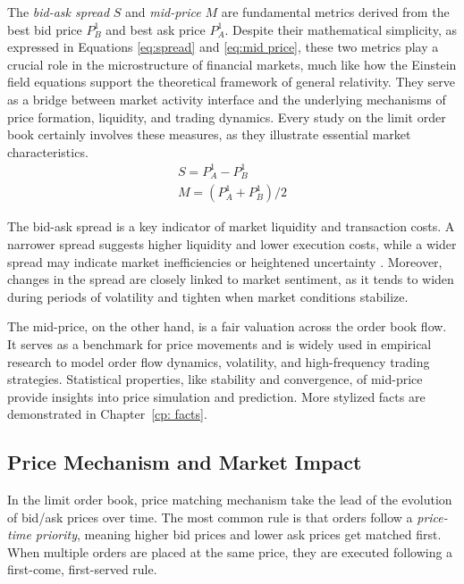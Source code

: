 The \textit{bid-ask spread} $S$ and \textit{mid-price} $M$ are fundamental metrics derived from the best bid price $P_B ^ {1}$ and best ask price $P_A ^ {1}$. Despite their mathematical simplicity, as expressed in Equations \ref{eq:spread} and \ref{eq:mid price}, these two metrics play a crucial role in the \gls{microstructure of financial markets}, much like how the Einstein field equations support the theoretical framework of general relativity. They serve as a bridge between market activity interface and the underlying mechanisms of price formation, liquidity, and trading dynamics. Every study on the limit order book certainly involves these measures, as they illustrate essential market characteristics.
\begin{align}
    S = P_A ^ {1} - P_B ^ {1}  \label{eq:spread}\\
    M = (P_A ^ {1} + P_B ^ {1})/2
    \label{eq:mid price}
\end{align}

The bid-ask spread is a key indicator of market liquidity and transaction costs. A narrower spread suggests higher liquidity and lower execution costs, while a wider spread may indicate market inefficiencies or heightened uncertainty \citep{GLOSTEN198571}. Moreover, changes in the spread are closely linked to market sentiment, as it tends to widen during periods of volatility and tighten when market conditions stabilize.

The mid-price, on the other hand, is a fair valuation across the order book flow. It serves as a benchmark for price movements and is widely used in empirical research to model order flow dynamics, volatility, and high-frequency trading strategies. Statistical properties, like stability and convergence, of mid-price provide insights into price simulation and prediction. More stylized facts are demonstrated in Chapter~\ref{cp: facts}. 

\subsection{Price Mechanism and Market Impact}
In the limit order book, price matching mechanism take the lead of the evolution of bid/ask prices over time. The most common rule is that orders follow a \textit{price-time priority}, meaning higher bid prices and lower ask prices get matched first. When multiple orders are placed at the same price, they are executed following a first-come, first-served rule. 

